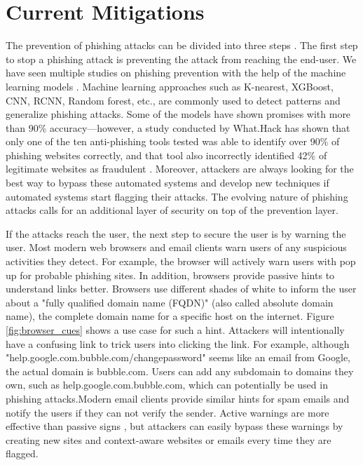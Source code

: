 \section{Current Mitigations}
The prevention of phishing attacks can be divided into three steps \cite{vayansky}. The first step to stop a phishing attack is preventing the attack from reaching the end-user. We have seen multiple studies on phishing prevention with the help of the machine learning models \cite{yang_zheng_wu_wu_wang_2021, sahingoz_buber_demir_diri_2019}. Machine learning approaches such as K-nearest, XGBoost, CNN, RCNN, Random forest, etc., are commonly used to detect patterns and generalize phishing attacks. Some of the models have shown promises with more than 90\% accuracy—however, a study conducted by What.Hack has shown that only one of the ten anti-phishing tools tested was able to identify over 90\% of phishing websites correctly, and that tool also incorrectly identified 42\% of legitimate websites as fraudulent \cite{what_hack}. Moreover, attackers are always looking for the best way to bypass these automated systems and develop new techniques if automated systems start flagging their attacks. The evolving nature of phishing attacks calls for an additional layer of security on top of the prevention layer.

If the attacks reach the user, the next step to secure the user is by warning the user. Most modern web browsers and email clients warn users of any suspicious activities they detect. For example, the browser will actively warn users with pop up for probable phishing sites. In addition, browsers provide passive hints to understand links better. Browsers use different shades of white to inform the user about a "fully qualified domain name (FQDN)" (also called absolute domain name), the complete domain name for a specific host on the internet. Figure \ref*{fig:browser_cues} shows a use case for such a hint. Attackers will intentionally have a confusing link to trick users into clicking the link. For example, although "help.google.com.bubble.com/changepassword" seems like an email from Google, the actual domain is bubble.com. Users can add any subdomain to domains they own, such as help.google.com.bubble.com, which can potentially be used in phishing attacks.Modern email clients provide similar hints for spam emails and notify the users if they can not verify the sender. Active warnings are more effective than passive signs \cite{vayansky}, but attackers can easily bypass these warnings by creating new sites and context-aware websites or emails every time they are flagged.

